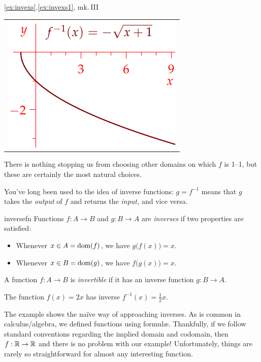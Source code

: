 \begin{example*}{\ref*{ex:invexs}.\ref{ex:invexs1}, mk.\,III}{}
\begin{center}
\begin{minipage}[t]{0.35\linewidth}
\begin{tabular}{@{}c@{}}
		\includegraphics{inverses-combi3}
	\end{tabular}
\end{minipage}
\end{center}
There is nothing stopping us from choosing other domains on which $f$ is 1--1, but these are certainly the most natural choices.
\end{example*}

\clearpage


\iffalse
\clearpage


You've long been used to the idea of inverse functions: $g=f^{-1}$ means that $g$ takes the \emph{output} of $f$ and returns the \emph{input,} and vice versa.

\begin{defn}{}{inversefn}
Functions $f:A\to B$ and $g:B\to A$ are \emph{inverses} if two properties are satisfied:
\begin{itemize}
  \item Whenever $x\in A=\operatorname{dom}(f)$, we have $g\bigl(f(x)\bigr)=x$.
  \item Whenever $x\in B=\operatorname{dom}(g)$, we have $f\bigl(g(x)\bigr)=x$.
\end{itemize}
A function $f:A\to B$ is \emph{invertible} if it has an inverse function $g:B\to A$. 
\end{defn}

\begin{example}{}{}
The function $f(x)=2x$ has inverse $f^{-1}(x)=\frac 12x$.
\end{example}

The example shows the naïve way of approaching inverses. As is common in calculus/algebra, we defined functions using formulæ. Thankfully, if we follow standard conventions regarding the implied domain and codomain, then $f:\mathbb{R}\to\mathbb{R}$ and there is no problem with our example! Unfortunately, things are rarely so straightforward for almost any interesting function.

